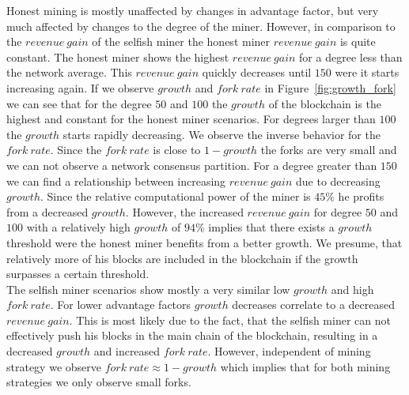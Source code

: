 Honest mining is mostly unaffected by changes in advantage factor, but very much affected by changes to the degree of the miner. However, in comparison to the $revenue~gain$ of the selfish miner the honest miner $revenue~gain$ is quite constant. The honest miner shows the highest $revenue~gain$ for a degree less than the network average. This $revenue~gain$ quickly decreases until $150$ were it starts increasing again. If we observe $growth$ and $fork~rate$ in Figure~\ref{fig:growth_fork} we can see that for the degree $50$ and $100$ the $growth$ of the blockchain is the highest and constant for the honest miner scenarios. For degrees larger than $100$ the $growth$ starts rapidly decreasing. We observe the inverse behavior for the $fork~rate$. Since the $fork~rate$ is close to $1-growth$ the forks are very small and we can not observe a network consensus partition. For a degree greater than $150$ we can find a relationship between increasing $revenue~gain$ due to decreasing $growth$. Since the relative computational power of the miner is $45\% $ he profits from a decreased $growth$. However, the increased $revenue~gain$ for degree $50$ and $100$ with a relatively high $growth$ of $94\% $ implies that there exists a $growth$ threshold were the honest miner benefits from a better growth. We presume, that relatively more of his blocks are included in the blockchain if the growth surpasses a certain threshold.\\
The selfish miner scenarios show mostly a very similar low $growth$ and high $fork~rate$. For lower advantage factors $growth$ decreases correlate to a decreased $revenue~gain$. This is most likely due to the fact, that the selfish miner can not effectively push his blocks in the main chain of the blockchain, resulting in a decreased $growth$ and increased $fork~rate$. However, independent of mining strategy we observe $fork~rate \approx 1-growth$ which implies that for both mining strategies we only observe small forks.
